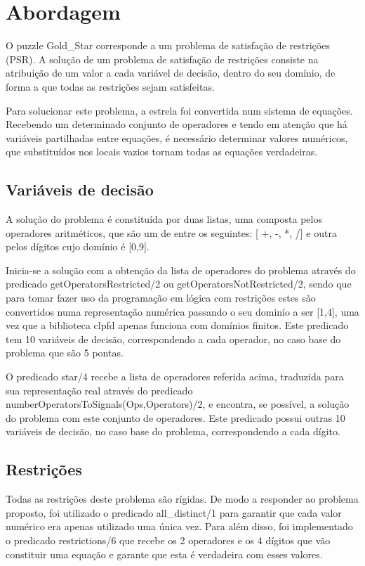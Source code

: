 \section{Abordagem}
O puzzle Gold\_Star corresponde a um problema de satisfação de restrições (PSR). A solução de um problema de satisfação de restrições consiste na atribuição de um valor a cada variável de decisão, dentro do seu domínio, de forma a que todas as restrições sejam satisfeitas.
 
Para solucionar este problema, a estrela foi convertida num sistema de equações. Recebendo um determinado conjunto de operadores e tendo em atenção que há variáveis partilhadas entre equações, é necessário determinar valores numéricos, que substituídos nos locais vazios tornam todas as equações verdadeiras.

 
\subsection{Variáveis de decisão}
A solução do problema é constituída por duas listas, uma composta pelos operadores aritméticos, que são um de entre os seguintes: [ +, -, *, /] e outra pelos dígitos cujo domínio é [0,9].

Inicia-se a solução com a obtenção da lista de operadores do problema através do predicado getOperatorsRestricted/2 ou getOperatorsNotRestricted/2, sendo que  para tomar fazer uso da programação em lógica com restrições estes são convertidos numa representação numérica passando o seu dominío a ser [1,4], uma vez que a biblioteca clpfd apenas funciona com domínios finitos. Este predicado tem 10 variáveis de decisão, correspondendo a cada operador, no caso base do problema que são 5 pontas.

O predicado star/4 recebe a lista de operadores referida acima, traduzida para sua representação real através do predicado numberOperatorsToSignals(Ops,Operators)/2, e encontra, se possível, a solução do problema com este conjunto de operadores. Este predicado possui outras 10 variáveis de decisão, no caso base do problema, correspondendo a cada dígito.
 

\subsection{Restrições}
Todas as restrições deste problema são rígidas.
De modo a responder ao problema proposto, foi utilizado o predicado all\_distinct/1 para garantir que cada valor numérico era apenas utilizado uma única vez. Para além disso, foi implementado o predicado restrictions/6 que recebe os 2 operadores e os 4 dígitos que vão constituir uma equação e garante que esta é verdadeira com esses valores.


